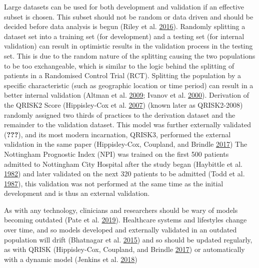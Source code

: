 \documentclass[
]{article}
\begin{document}
Large datasets can be used for both development and validation if an effective subset is chosen. This subset should not be random or data driven and should be decided before data analysis is begun (Riley et al. \protect\hyperlink{ref-riley_external_2016}{2016}). Randomly splitting a dataset set into a training set (for development) and a testing set (for internal validation) can result in optimistic results in the validation process in the testing set. This is due to the random nature of the splitting causing the two populations to be too exchangeable, which is similar to the logic behind the splitting of patients in a Randomised Control Trial (RCT). Splitting the population by a specific characteristic (such as geographic location or time period) can result in a better internal validation (Altman et al. \protect\hyperlink{ref-altman_prognosis_2009}{2009}; Ivanov et al. \protect\hyperlink{ref-ivanov_predictive_2000}{2000}). Derivation of the QRISK2 Score (Hippisley-Cox et al. \protect\hyperlink{ref-hippisley-cox_derivation_2007}{2007}) (known later as QRISK2-2008) randomly assigned two thirds of practices to the derivation dataset and the remainder to the validation dataset. This model was further externally validated ({\textbf{???}}), and its most modern incarnation, QRISK3, performed the external validation in the same paper (Hippisley-Cox, Coupland, and Brindle \protect\hyperlink{ref-hippisley-cox_development_2017}{2017}) The Nottingham Prognostic Index (NPI) was trained on the first 500 patients admitted to Nottingham City Hospital after the study began (Haybittle et al. \protect\hyperlink{ref-haybittle_prognostic_1982}{1982}) and later validated on the next 320 patients to be admitted (Todd et al. \protect\hyperlink{ref-todd_confirmation_1987}{1987}), this validation was not performed at the same time as the initial development and is thus an external validation.

As with any technology, clinicians and researchers should be wary of models becoming outdated (Pate et al. \protect\hyperlink{ref-pate_uncertainty_2019}{2019}). Healthcare systems and lifestyles change over time, and so models developed and externally validated in an outdated population will drift (Bhatnagar et al. \protect\hyperlink{ref-bhatnagar_epidemiology_2015}{2015}) and so should be updated regularly, as with QRISK (Hippisley-Cox, Coupland, and Brindle \protect\hyperlink{ref-hippisley-cox_development_2017}{2017}) or automatically with a dynamic model (Jenkins et al. \protect\hyperlink{ref-jenkins_dynamic_2018}{2018})
\end{document}
